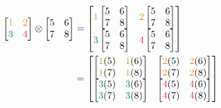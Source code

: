 \documentclass[conference]{IEEEtran}
\begin{document}
\begin{appendices}
\begin{equation*}
\begin{split}
\begin{bmatrix}
\textcolor{LimeGreen}{1} & \textcolor{orange}{2} \\
\textcolor{PineGreen}{3} & \textcolor{Red}{4}
\end{bmatrix}
\otimes
\begin{bmatrix}
5 & 6 \\
7 & 8
\end{bmatrix}
& =
\begin{bmatrix}
\textcolor{LimeGreen}{1}\begin{bmatrix}
5 & 6 \\
7 & 8
\end{bmatrix} & \textcolor{orange}{2}\begin{bmatrix}
5 & 6 \\
7 & 8
\end{bmatrix} \\
\textcolor{PineGreen}{3}\begin{bmatrix}
5 & 6 \\
7 & 8
\end{bmatrix} & \textcolor{Red}{4}\begin{bmatrix}
5 & 6 \\
7 & 8
\end{bmatrix} \\
\end{bmatrix} \\
& =
\begin{bmatrix}
\begin{bmatrix}
\textcolor{LimeGreen}{1}(5) & \textcolor{LimeGreen}{1}(6) \\
\textcolor{LimeGreen}{1}(7) & \textcolor{LimeGreen}{1}(8)
\end{bmatrix} & \begin{bmatrix}
\textcolor{orange}{2}(5) & \textcolor{orange}{2}(6) \\
\textcolor{orange}{2}(7) & \textcolor{orange}{2}(8)
\end{bmatrix} \\
\begin{bmatrix}
\textcolor{PineGreen}{3}(5) & \textcolor{PineGreen}{3}(6) \\
\textcolor{PineGreen}{3}(7) & \textcolor{PineGreen}{3}(8)
\end{bmatrix} & \begin{bmatrix}
\textcolor{Red}{4}(5) & \textcolor{Red}{4}(6) \\
\textcolor{Red}{4}(7) & \textcolor{Red}{4}(8)

\end{bmatrix}
\end{bmatrix}
\end{split}
\end{equation*}
\end{appendices}
\end{document}
